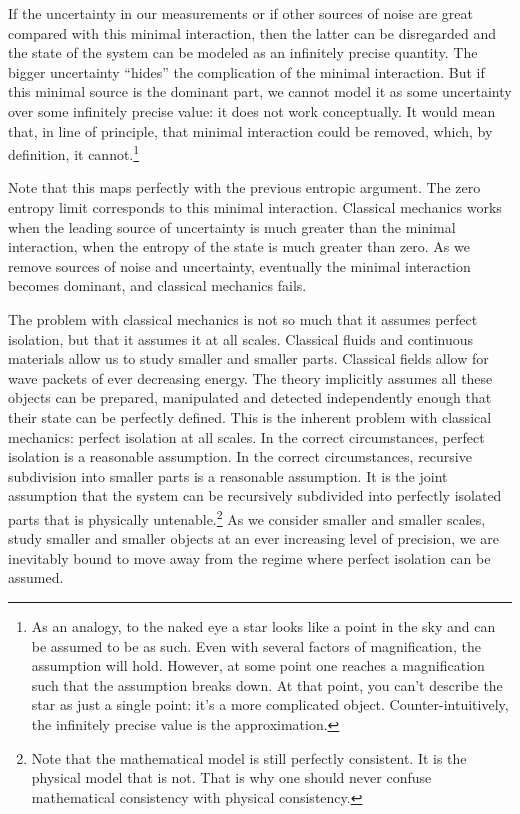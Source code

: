 \documentclass[10pt,twocolumn, nofootinbib]{revtex4-2}
\begin{document}
If the uncertainty in our measurements or if other sources of noise are great compared with this minimal interaction, then the latter can be disregarded and the state of the system can be modeled as an infinitely precise quantity. The bigger uncertainty ``hides'' the complication of the minimal interaction. But if this minimal source is the dominant part, we cannot model it as some uncertainty over some infinitely precise value: it does not work conceptually. It would mean that, in line of principle, that minimal interaction could be removed, which, by definition, it cannot.\footnote{As an analogy, to the naked eye a star looks like a point in the sky and can be assumed to be as such. Even with several factors of magnification, the assumption will hold. However, at some point one reaches a magnification such that the assumption breaks down. At that point, you can't describe the star as just a single point: it's a more complicated object. Counter-intuitively, the infinitely precise value is the approximation.}

Note that this maps perfectly with the previous entropic argument. The zero entropy limit corresponds to this minimal interaction. Classical mechanics works when the leading source of uncertainty is much greater than the minimal interaction, when the entropy of the state is much greater than zero. As we remove sources of noise and uncertainty, eventually the minimal interaction becomes dominant, and classical mechanics fails.

The problem with classical mechanics is not so much that it assumes perfect isolation, but that it assumes it at all scales. Classical fluids and continuous materials allow us to study smaller and smaller parts. Classical fields allow for wave packets of ever decreasing energy. The theory implicitly assumes all these objects can be prepared, manipulated and detected independently enough that their state can be perfectly defined. This is the inherent problem with classical mechanics: perfect isolation at all scales. In the correct circumstances, perfect isolation is a reasonable assumption. In the correct circumstances, recursive subdivision into smaller parts is a reasonable assumption. It is the joint assumption that the system can be recursively subdivided into perfectly isolated parts that is physically untenable.\footnote{Note that the mathematical model is still perfectly consistent. It is the physical model that is not. That is why one should never confuse mathematical consistency with physical consistency.} As we consider smaller and smaller scales, study smaller and smaller objects at an ever increasing level of precision, we are inevitably bound to move away from the regime where perfect isolation can be assumed.
\end{document}
